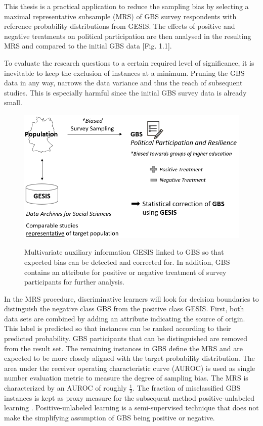 This thesis is a practical application to reduce the sampling bias by selecting a maximal representative subsample (MRS) of GBS survey respondents with reference probability distributions from GESIS. The effects of positive and negative treatments on political participation are then analysed in the resulting MRS and compared to the initial GBS data [Fig. 1.1].

To evaluate the research questions to a certain required level of significance, it is inevitable to keep the exclusion of instances at a minimum. Pruning the GBS data in any way, narrows the data variance and thus the reach of subsequent studies. This is especially harmful since the initial GBS survey data is already small.

\vspace{20pt}
\begin{figure}[ht]
	\begin{center}
		\includegraphics[scale=0.60,angle=0]{fig/overview}
		\label{project}
		\caption{Multivariate auxiliary information GESIS linked to GBS so that expected bias can be detected and corrected for. In addition, GBS contains an attribute for positive or negative treatment of survey participants for further analysis.}
	\end{center}
\end{figure}

In the MRS procedure, discriminative learners will look for decision boundaries to distinguish the negative class GBS from the positive class GESIS. First, both data sets are combined by adding an attribute indicating the source of origin. This label is predicted so that instances can be ranked according to their predicted probability. GBS participants that can be distinguished are removed from the result set. The remaining instances in GBS define the MRS and are expected to be more closely aligned with the target probability distribution.  The area under the receiver operating characteristic curve (AUROC) is used as single number evaluation metric to measure the degree of sampling bias. The MRS is characterized by an AUROC of roughly \(\frac{1}{2}\). The fraction of misclassified GBS instances is kept as proxy measure for the subsequent method positive-unlabeled learning \cite{denis, claesen}. Positive-unlabeled learning is a semi-supervised technique that does not make the simplifying assumption of GBS being positive or negative.

